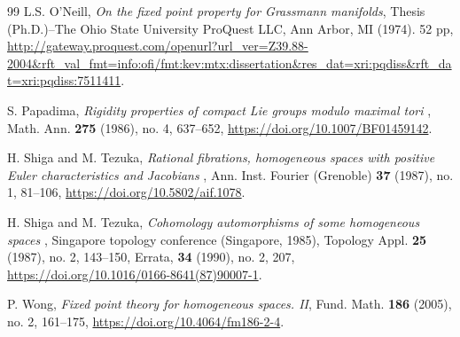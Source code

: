 \documentclass{amsart}
\begin{document}
\begin{thebibliography}{99}
 L.S. %
O'Neill, \textit{On the fixed point property for Grassmann manifolds}, Thesis %
(Ph.D.)--The Ohio State University %
ProQuest LLC, Ann Arbor, MI (1974). 52 %
pp, \url{http://gateway.proquest.com/openurl?url_ver=Z39.88-2004&rft_val_fmt=info:ofi/fmt:kev:mtx:dissertation&res_dat=xri:pqdiss&rft_dat=xri:pqdiss:7511411}.
  
 S. Papadima, \textit{Rigidity properties of compact Lie groups modulo maximal tori}%
, Math. Ann. \textbf{275} (1986), no. 4, 637--652, \url{https://doi.org/10.1007/BF01459142}.
	
 H. Shiga and %
M. Tezuka, \textit{Rational fibrations, homogeneous spaces with positive Euler characteristics and Jacobians}%
, Ann. Inst. Fourier (Grenoble) \textbf{37} (1987), no. 1, 81--106, \url{https://doi.org/10.5802/aif.1078}.
	
H. Shiga and %
M. Tezuka, \textit{Cohomology automorphisms of some homogeneous spaces}%
, Singapore topology conference (Singapore, 1985), Topology Appl. \textbf{25} (1987), no. 2, 143--150, Errata, \textbf{34} (1990), no. 2, 207, \url{https://doi.org/10.1016/0166-8641(87)90007-1}.

 P. Wong, \textit{Fixed point theory for homogeneous spaces. II}, Fund. Math. \textbf{186} (2005), no. 2, 161--175, \url{https://doi.org/10.4064/fm186-2-4}.
\end{thebibliography}
\end{document}
